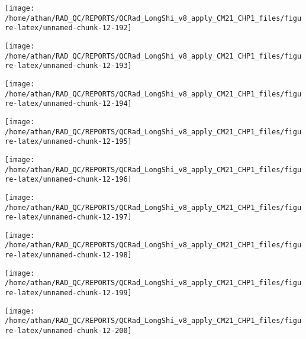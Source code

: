 \documentclass[
  10pt,
  a4paper,oneside]{article}
\begin{document}
\begin{center}\texttt{[image: /home/athan/RAD\_QC/REPORTS/QCRad\_LongShi\_v8\_apply\_CM21\_CHP1\_files/figure-latex/unnamed-chunk-12-192]} \end{center}

\begin{center}\texttt{[image: /home/athan/RAD\_QC/REPORTS/QCRad\_LongShi\_v8\_apply\_CM21\_CHP1\_files/figure-latex/unnamed-chunk-12-193]} \end{center}

\begin{center}\texttt{[image: /home/athan/RAD\_QC/REPORTS/QCRad\_LongShi\_v8\_apply\_CM21\_CHP1\_files/figure-latex/unnamed-chunk-12-194]} \end{center}

\begin{center}\texttt{[image: /home/athan/RAD\_QC/REPORTS/QCRad\_LongShi\_v8\_apply\_CM21\_CHP1\_files/figure-latex/unnamed-chunk-12-195]} \end{center}

\begin{center}\texttt{[image: /home/athan/RAD\_QC/REPORTS/QCRad\_LongShi\_v8\_apply\_CM21\_CHP1\_files/figure-latex/unnamed-chunk-12-196]} \end{center}

\begin{center}\texttt{[image: /home/athan/RAD\_QC/REPORTS/QCRad\_LongShi\_v8\_apply\_CM21\_CHP1\_files/figure-latex/unnamed-chunk-12-197]} \end{center}

\begin{center}\texttt{[image: /home/athan/RAD\_QC/REPORTS/QCRad\_LongShi\_v8\_apply\_CM21\_CHP1\_files/figure-latex/unnamed-chunk-12-198]} \end{center}

\begin{center}\texttt{[image: /home/athan/RAD\_QC/REPORTS/QCRad\_LongShi\_v8\_apply\_CM21\_CHP1\_files/figure-latex/unnamed-chunk-12-199]} \end{center}

\begin{center}\texttt{[image: /home/athan/RAD\_QC/REPORTS/QCRad\_LongShi\_v8\_apply\_CM21\_CHP1\_files/figure-latex/unnamed-chunk-12-200]} \end{center}
\end{document}
